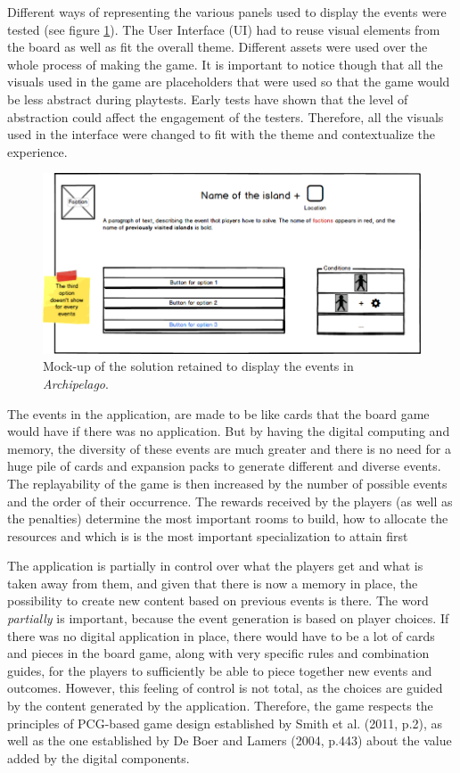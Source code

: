 Different ways of representing the various panels used to display the events were tested (see figure \ref{fig:uimockup}). The User Interface (UI) had to reuse visual elements from the board as well as fit the overall theme. Different assets were used over the whole process of making the game. It is important to notice though that all the visuals used in the game are placeholders that were used so that the game would be less abstract during playtests. Early tests have shown that the level of abstraction could affect the engagement of the testers. Therefore, all the visuals used in the interface were changed to fit with the theme and contextualize the experience.
\begin{figure}[!ht]
    \centering
    \includegraphics[width=\textwidth]{Images/event.png}
    \caption{Mock-up of the solution retained to display the events in \textit{Archipelago}.}
    \label{fig:uimockup}
\end{figure}

The events in the application, are made to be like cards that the board game would have if there was no application. But by having the digital computing and memory, the diversity of these events are much greater and there is no need for a huge pile of cards and expansion packs to generate different and diverse events. The replayability of the game is then increased by the number of possible events and the order of their occurrence. The rewards received by the players (as well as the penalties) determine the most important rooms to build, how to allocate the resources and which is is the most important specialization to attain first

The application is partially in control over what the players get and what is taken away from them, and given that there is now a memory in place, the possibility to create new content based on previous events is there. The word \textit{partially} is important, because the event generation is based on player choices. If there was no digital application in place, there would have to be a lot of cards and pieces in the board game, along with very specific rules and combination guides, for the players to sufficiently be able to piece together new events and outcomes. However, this feeling of control is not total, as the choices are guided by the content generated by the application. Therefore, the game respects the principles of PCG-based game design established by Smith et al. (2011, p.2)\cite{pdf:pcgbased}, as well as the one established by De Boer and Lamers (2004, p.443)\cite{chap:aug} about the value added by the digital components.

